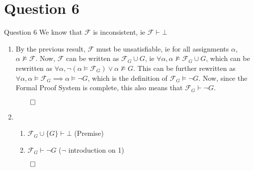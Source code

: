 \documentclass{beamer}
\begin{document}
    \section{Question 6}
    {
        \begin{frame}{Question 6}
            We know that $\mathcal{F}$ is inconsistent, ie $\mathcal{F} \vdash \bot$
            \begin{enumerate}
                \item By the previous result, $\mathcal{F}$ must be unsatisfiable, ie for all assignments $\alpha$, $\alpha \nvDash \mathcal{F}$. Now, $\mathcal{F}$ can be written as $\mathcal{F}_{G} \cup {G}$, ie $\forall \alpha, \alpha \nvDash \mathcal{F}_{G} \cup {G}$, which can be rewritten as $\forall \alpha, \neg (\alpha \models \mathcal{F}_{G}) \lor \alpha \nvDash G$. This can be further rewritten as $\forall \alpha, \alpha \models \mathcal{F}_{G} \implies \alpha \models \neg G$, which is the definition of $\mathcal{F}_{G} \models \neg G$. Now, since the Formal Proof System is complete, this also means that $\mathcal{F}_{G} \vdash \neg G$.
                
                $\qed$
                \item \begin{enumerate}
                    \item $\mathcal{F}_{G} \cup \{G\} \vdash \bot$ (Premise)
                    \item $\mathcal{F}_{G} \vdash \neg G$ ($\neg$ introduction on 1)
                \end{enumerate}
                $\qed$
            \end{enumerate}
        \end{frame}
    }
\end{document}
